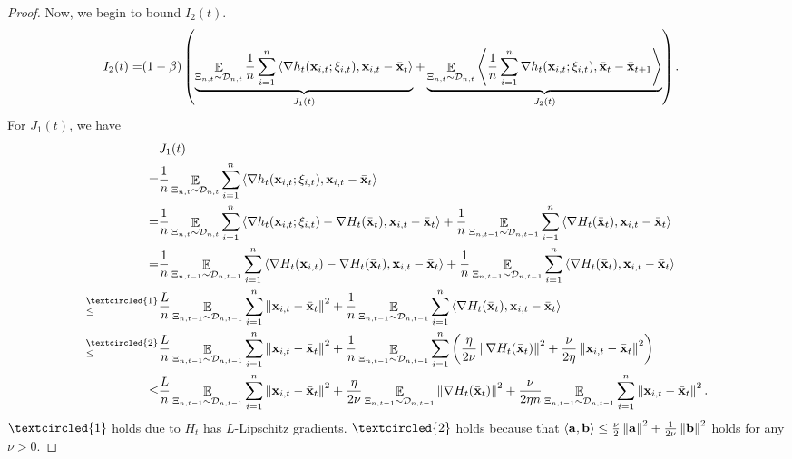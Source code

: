 \documentclass{article}
\begin{document}
\begin{proof}
Now, we begin to bound $I_2(t)$.
\begin{align}
\nonumber
I_2(t) = & (1-\beta)  \left( \underbrace{ \mathop{\mathbb{E}}_{ \Xi_{n,t} \sim \mathcal{D}_{n,t} }\frac{1}{n}\sum_{i=1}^n\left\langle\nabla h_t({\bf x}_{i,t}; \xi_{i,t}), {\bf x}_{i,t} - \bar{{\bf x}}_t  \right\rangle }_{J_1(t)} +  \underbrace{ \mathop{\mathbb{E}}_{ \Xi_{n,t} \sim \mathcal{D}_{n,t} }\left\langle\frac{1}{n}\sum_{i=1}^n \nabla h_t({\bf x}_{i,t};\xi_{i,t}), \bar{{\bf x}}_t - \bar{{\bf x}}_{t+1}  \right\rangle}_{J_2(t)} \right).
\end{align} For $J_1(t)$, we have
\begin{align}
\nonumber
& J_1(t) \\ \nonumber 
= & \frac{1}{n}\EE_{ \Xi_{n,t} \sim \Dcal_{n,t} }\sum_{i=1}^n\lrangle{\nabla h_t(\x_{i,t}; \xi_{i,t}), \x_{i,t} - \bar{\x}_t } \\ \nonumber
= & \frac{1}{n}\EE_{ \Xi_{n,t} \sim \Dcal_{n,t} } \sum_{i=1}^n\lrangle{\nabla h_t(\x_{i,t}; \xi_{i,t}) - \nabla H_t(\bar{\x}_t), \x_{i,t} - \bar{\x}_t } + \frac{1}{n}\EE_{ \Xi_{n,t-1} \sim \Dcal_{n,t-1} }\sum_{i=1}^n\lrangle{\nabla H_t(\bar{\x}_t), \x_{i,t} - \bar{\x}_t } \\ \nonumber
= & \frac{1}{n}\EE_{ \Xi_{n,t-1} \sim \Dcal_{n,t-1} }\sum_{i=1}^n\lrangle{\nabla H_t(\x_{i,t}) - \nabla H_t(\bar{\x}_t), \x_{i,t} - \bar{\x}_t } + \frac{1}{n}\EE_{ \Xi_{n,t-1} \sim \Dcal_{n,t-1} }\sum_{i=1}^n\lrangle{\nabla H_t(\bar{\x}_t), \x_{i,t} - \bar{\x}_t } \\ \nonumber
\refabovecir{\le}{\textcircled{1}} & \frac{L}{n}\EE_{ \Xi_{n,t-1} \sim \Dcal_{n,t-1} }\sum_{i=1}^n \lrnorm{\x_{i,t} - \bar{\x}_t}^2 + \frac{1}{n}\EE_{ \Xi_{n,t-1} \sim \Dcal_{n,t-1} }\sum_{i=1}^n\lrangle{\nabla H_t(\bar{\x}_t), \x_{i,t} - \bar{\x}_t } \\ \nonumber
\refabovecir{\le}{\textcircled{2}} & \frac{L}{n}\EE_{ \Xi_{n,t-1} \sim \Dcal_{n,t-1} }\sum_{i=1}^n \lrnorm{\x_{i,t} - \bar{\x}_t}^2 + \frac{1}{n}\EE_{ \Xi_{n,t-1} \sim \Dcal_{n,t-1} }\sum_{i=1}^n\lrincir{\frac{\eta}{2\nu}\lrnorm{\nabla H_t(\bar{\x}_t)}^2 + \frac{\nu}{2\eta}\lrnorm{\x_{i,t} - \bar{\x}_t }^2 } \\ \label{equa_theorem_temp0}
\le & \frac{L}{n}\EE_{ \Xi_{n,t-1} \sim \Dcal_{n,t-1} }\sum_{i=1}^n \lrnorm{\x_{i,t} - \bar{\x}_t}^2 + \frac{\eta}{2\nu}\EE_{ \Xi_{n,t-1} \sim \Dcal_{n,t-1} }\lrnorm{\nabla H_t(\bar{\x}_t)}^2 + \frac{\nu}{2\eta n}\EE_{ \Xi_{n,t-1} \sim \Dcal_{n,t-1} }\sum_{i=1}^n\lrnorm{\x_{i,t} - \bar{\x}_t }^2. 
\end{align} $\textcircled{1}$ holds due to $H_t$ has $L$-Lipschitz gradients. $\textcircled{2}$ holds because that $\left\langle{\bf a},{\bf b} \right\rangle \le \frac{\nu}{2}\left\lVert{\bf a}\right\rVert^2 + \frac{1}{2\nu}\left\lVert{\bf b}\right\rVert^2$ holds for any $\nu>0$. 



\end{proof}
\end{document}
